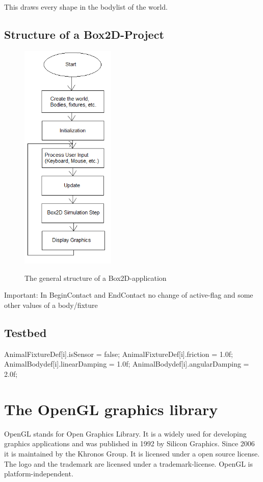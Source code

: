 \documentclass[10pt,a4paper,DIV=11]{scrreprt}
\begin{document}
This draws every shape in the bodylist of the world.

\section{Structure of a Box2D-Project}


\begin{center}
	\begin{figure}[H]
		\centering
		\includegraphics[width=0.4\textwidth,scale=0.5]{files/Box2D-structure.png}
		\caption{The general structure of a Box2D-application} \cite{box2d-structure}
		\label{fig:box2d-structure}
	\end{figure}
\end{center}



Important: In BeginContact and EndContact no change of active-flag and some other values of a body/fixture


\section{Testbed}


AnimalFixtureDef[i].isSensor = false;
AnimalFixtureDef[i].friction = 1.0f;
AnimalBodydef[i].linearDamping = 1.0f;
AnimalBodydef[i].angularDamping = 2.0f;

\chapter{The OpenGL graphics library}
OpenGL stands for Open Graphics Library. It is a widely used for developing graphics applications and was published in 1992 by Silicon Graphics. Since 2006 it is maintained by the Khronos Group. It is licensed under a open source license. The logo and the trademark are licensed under a trademark-license.
OpenGL is platform-independent.
\end{document}
